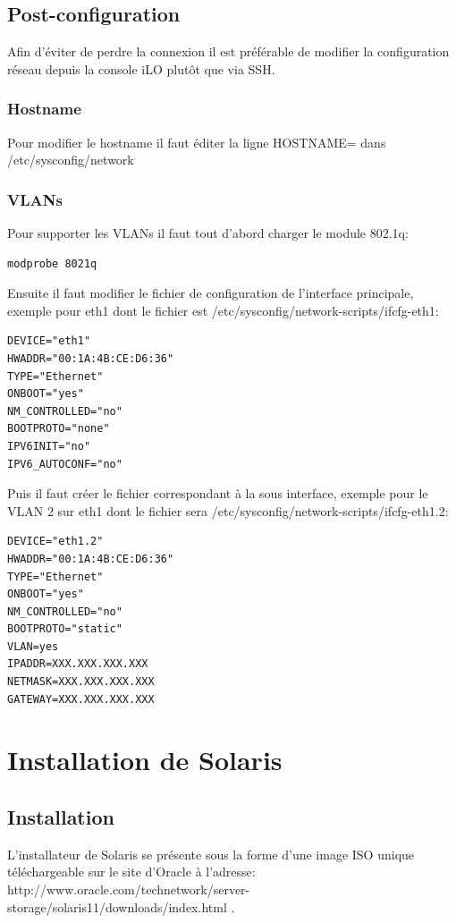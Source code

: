 \documentclass[a4paper,oneside]{report}
\begin{document}
\subsection{Post-configuration}
Afin d'éviter de perdre la connexion il est préférable de modifier la configuration réseau depuis la console iLO plutôt que via SSH.

\subsubsection{Hostname}
Pour modifier le hostname il faut éditer la ligne HOSTNAME= dans /etc/sysconfig/network

\subsubsection{VLANs}
Pour supporter les VLANs il faut tout d'abord charger le module 802.1q:
\begin{verbatim}
modprobe 8021q
\end{verbatim}

Ensuite il faut modifier le fichier de configuration de l'interface principale, exemple pour eth1 dont le fichier est /etc/sysconfig/network-scripts/ifcfg-eth1:
\begin{verbatim}
DEVICE="eth1"
HWADDR="00:1A:4B:CE:D6:36"
TYPE="Ethernet"
ONBOOT="yes"
NM_CONTROLLED="no"
BOOTPROTO="none"
IPV6INIT="no"
IPV6_AUTOCONF="no"
\end{verbatim}

Puis il faut créer le fichier correspondant à la sous interface, exemple pour le VLAN 2 sur eth1 dont le fichier sera /etc/sysconfig/network-scripts/ifcfg-eth1.2:
\begin{verbatim}
DEVICE="eth1.2"
HWADDR="00:1A:4B:CE:D6:36"
TYPE="Ethernet"
ONBOOT="yes"
NM_CONTROLLED="no"
BOOTPROTO="static"
VLAN=yes
IPADDR=XXX.XXX.XXX.XXX
NETMASK=XXX.XXX.XXX.XXX
GATEWAY=XXX.XXX.XXX.XXX
\end{verbatim}

\section{Installation de Solaris} \label{sec:installsolaris}
\subsection{Installation}
L'installateur de Solaris se présente sous la forme d'une image ISO unique téléchargeable sur le site d'Oracle à l'adresse: http://www.oracle.com/technetwork/server-storage/solaris11/downloads/index.html .
\end{document}
